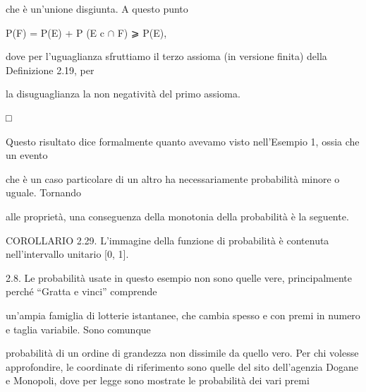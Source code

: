\documentclass[a4paper,portrait,12pt]{article}
\begin{document}
\begin{flushleft}
che \`{e} un'unione disgiunta. A questo punto
\end{flushleft}


\begin{flushleft}
P(F) = P(E) + P (E c $\cap$ F) ⩾ P(E),
\end{flushleft}


\begin{flushleft}
dove per l'uguaglianza sfruttiamo il terzo assioma (in versione finita) della Definizione 2.19, per
\end{flushleft}


\begin{flushleft}
la disuguaglianza la non negativit\`{a} del primo assioma.
\end{flushleft}


□


\begin{flushleft}
Questo risultato dice formalmente quanto avevamo visto nell'Esempio 1, ossia che un evento
\end{flushleft}


\begin{flushleft}
che \`{e} un caso particolare di un altro ha necessariamente probabilit\`{a} minore o uguale. Tornando
\end{flushleft}


\begin{flushleft}
alle propriet\`{a}, una conseguenza della monotonia della probabilit\`{a} \`{e} la seguente.
\end{flushleft}


\begin{flushleft}
COROLLARIO 2.29. L'immagine della funzione di probabilit\`{a} \`{e} contenuta nell'intervallo unitario [0, 1].
\end{flushleft}


\begin{flushleft}
2.8. Le probabilit\`{a} usate in questo esempio non sono quelle vere, principalmente perch\'{e} ``Gratta e vinci'' comprende
\end{flushleft}


\begin{flushleft}
un'ampia famiglia di lotterie istantanee, che cambia spesso e con premi in numero e taglia variabile. Sono comunque
\end{flushleft}


\begin{flushleft}
probabilit\`{a} di un ordine di grandezza non dissimile da quello vero. Per chi volesse approfondire, le coordinate di riferimento sono quelle del sito dell'agenzia Dogane e Monopoli, dove per legge sono mostrate le probabilit\`{a} dei vari premi
\end{flushleft}
\end{document}
